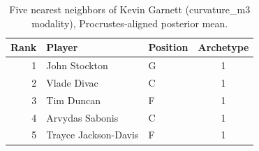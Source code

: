 \begin{table}[htbp]
  \centering\small
  \begin{tabular}{rllc}
    \toprule
    Rank & Player & Position & Archetype \\
    \midrule
    1 & John Stockton & G & 1 \\
    2 & Vlade Divac & C & 1 \\
    3 & Tim Duncan & F & 1 \\
    4 & Arvydas Sabonis & C & 1 \\
    5 & Trayce Jackson-Davis & F & 1 \\
    \bottomrule
  \end{tabular}
  \caption{Five nearest neighbors of Kevin Garnett (curvature_m3 modality), Procrustes-aligned posterior mean.}
  \label{tab:Kevin_Garnett_neighbors_curvature_m3}
\end{table}

